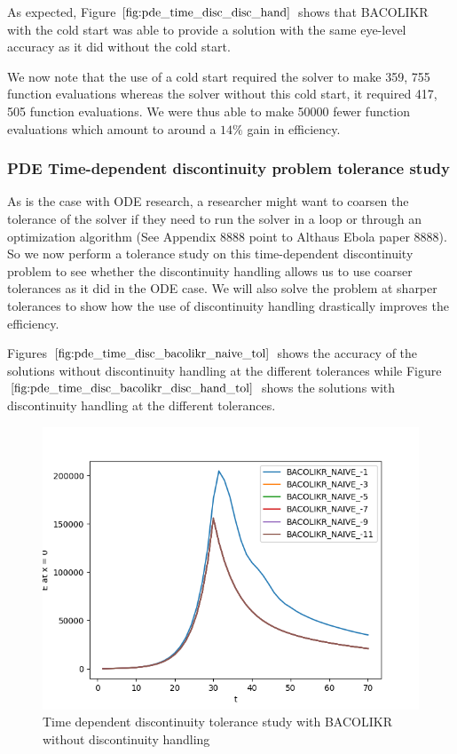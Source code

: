 \documentclass{article}
\begin{document}
As expected, Figure $\ref{fig:pde_time_disc_disc_hand}$ shows that BACOLIKR with the cold start was able to provide a solution with the same eye-level accuracy as it did without the cold start.

We now note that the use of a cold start required the solver to make 359, 755 function evaluations whereas the solver without this cold start, it required 417, 505 function evaluations. We were thus able to make 50000 fewer function evaluations which amount to around a $14\%$ gain in efficiency.

\subsubsection{PDE Time-dependent discontinuity problem tolerance study}
\label{subsubsection:pde_time_tol}

As is the case with ODE research, a researcher might want to coarsen the tolerance of the solver if they need to run the solver in a loop or through an optimization algorithm (See Appendix 8888 point to Althaus Ebola paper 8888). So we now perform a tolerance study on this time-dependent discontinuity problem to see whether the discontinuity handling allows us to use coarser tolerances as it did in the ODE case. We will also solve the problem at sharper tolerances to show how the use of discontinuity handling drastically improves the efficiency.

Figures $\ref{fig:pde_time_disc_bacolikr_naive_tol}$ shows the accuracy of the solutions without discontinuity handling at the different tolerances while Figure $\ref{fig:pde_time_disc_bacolikr_disc_hand_tol}$ shows the solutions with discontinuity handling at the different tolerances.
\begin{figure}[H]
\centering
\includegraphics[width=0.7\linewidth]{./figures/pde_time_disc_bacolikr_naive_tol}
\caption{Time dependent discontinuity tolerance study with BACOLIKR without discontinuity handling}
\label{fig:pde_time_disc_bacolikr_naive_tol}
\end{figure}
\end{document}
